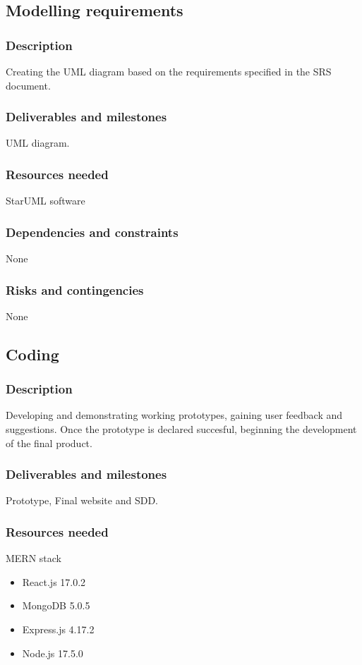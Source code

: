 \documentclass[12pt, letterpaper, twoside]{report}
\begin{document}
\subsection{Modelling requirements}
\subsubsection{Description}
Creating the UML diagram based on the requirements specified in the SRS document.
\subsubsection{Deliverables and milestones}
UML diagram.
\subsubsection{Resources needed}
StarUML software
\subsubsection{Dependencies and constraints}
None
\subsubsection{Risks and contingencies}
None
\subsection{Coding}
\subsubsection{Description}
Developing and demonstrating working prototypes, gaining user feedback and suggestions. Once the prototype is declared succesful, beginning the development of the final product.
\subsubsection{Deliverables and milestones}
Prototype, Final website and SDD.
\subsubsection{Resources needed}
MERN stack
\begin{itemize}
\item React.js 17.0.2
\item MongoDB 5.0.5
\item Express.js 4.17.2
\item Node.js 17.5.0
\end{itemize}
\end{document}
